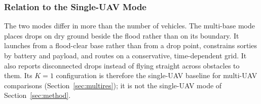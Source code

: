 \subsubsection{Relation to the Single-UAV Mode}
The two modes differ in more than the number of vehicles. The multi-base mode places drops on dry ground beside the flood rather than on its boundary. It launches from a flood-clear base rather than from a drop point, constrains sorties by battery and payload, and routes on a conservative, time-dependent grid. It also reports disconnected drops instead of flying straight across obstacles to them. Its $K=1$ configuration is therefore the single-UAV baseline for multi-UAV comparisons (Section~\ref{sec:multires}); it is not the single-UAV mode of Section~\ref{sec:method}.
